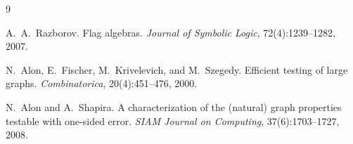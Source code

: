 \documentclass[11pt]{article}
\theoremstyle{definition}
\begin{document}
\begin{thebibliography}{9}

A.~A.~Razborov.
\newblock Flag algebras.
\newblock \emph{Journal of Symbolic Logic}, 72(4):1239--1282, 2007.

N.~Alon, E.~Fischer, M.~Krivelevich, and M.~Szegedy.
\newblock Efficient testing of large graphs.
\newblock \emph{Combinatorica}, 20(4):451--476, 2000.

N.~Alon and A.~Shapira.
\newblock A characterization of the (natural) graph properties testable
with one-sided error.
\newblock \emph{SIAM Journal on Computing}, 37(6):1703--1727, 2008.

\end{thebibliography}
\end{document}
